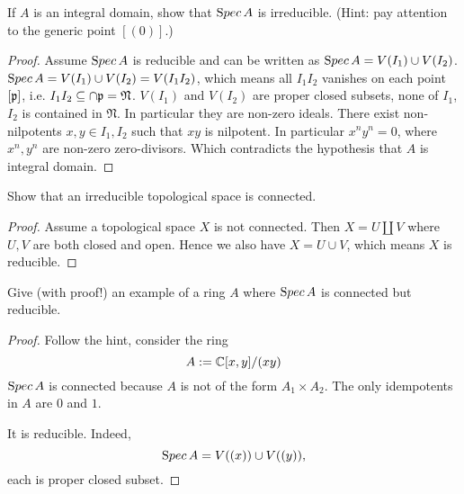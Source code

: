 \documentclass[11pt,fleqn]{book}
\begin{document}
\begin{exr}\label{chap3exr:Integral_domain_irreducible}
If $A$ is an integral domain, show that ${\text Spec\,} A$ is irreducible. (Hint: pay attention to the generic point $[(0)]$.)
\end{exr}
\begin{proof}
Assume ${\text Spec\,} A$ is reducible and can be written as ${\text Spec\,} A=V(I_1)\cup V(I_2)$.
${\text Spec\,} A=V(I_1)\cup V(I_2)=V(I_1 I_2)$, which means all $I_1I_2$ vanishes on each point $[{\mathfrak p}]$, i.e. $I_1I_2\subseteq\cap {\mathfrak p}=\mathfrak{N}$. $V(I_1)$ and $V(I_2)$ are proper closed subsets, none of $I_1$, $I_2$ is contained in $\mathfrak{N}$. In particular they are non-zero ideals. There exist non-nilpotents $x,y\in I_1,I_2$ such that $xy$ is nilpotent. In particular $x^ny^n=0$, where $x^n, y^n$ are non-zero zero-divisors. Which contradicts the hypothesis that $A$ is integral domain.
\end{proof}

\begin{exr}\label{chap3exr:irreducible_topological_space_connected}
Show that an irreducible topological space is connected.
\end{exr}
\begin{proof}
Assume a topological space $X$ is not connected. Then $X=U\coprod V$ where $U, V$ are both closed and open. Hence we also have $X=U\cup V$, which means $X$ is reducible. 
\end{proof}

\begin{exr}
Give (with proof!) an example of a ring $A$ where ${\text Spec\,} A$ is connected but reducible.
\end{exr}
\begin{proof}
Follow the hint, consider the ring 
$$
A:=\mathbb C[x,y]/(xy)
$$
${\text Spec\,} A$ is connected because $A$ is not of the form $A_1\times A_2$. The only idempotents in $A$ are $0$ and $1$.

It is reducible. Indeed,
$$
{\text Spec\,} A=V((x))\cup V((y)),
$$
each is proper closed subset.
\end{proof}
\end{document}
